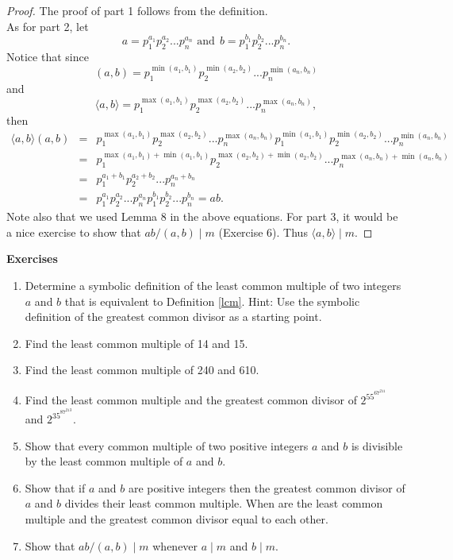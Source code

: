 \documentclass[12pt,letterpaper]{book}
\begin{document}
\begin{proof}
The proof of part 1 follows from the definition.  \\
As for part 2, let
\begin{equation*}
a=p_1^{a_1}p_2^{a_2}...p_n^{a_n} \mbox{ and} \ \
b=p_1^{b_1}p_2^{b_2}...p_n^{b_n}.
\end{equation*}
Notice that since
\begin{equation*}
(a,b)=p_1^{\min(a_1,b_1)}p_2^{\min(a_2,b_2)}...p_n^{\min(a_n,b_n)}
\end{equation*}
and
\begin{equation*}
\langle
a,b\rangle=p_1^{\max(a_1,b_1)}p_2^{\max(a_2,b_2)}...p_n^{\max(a_n,b_n)},
\end{equation*}
then
\begin{eqnarray*}
\langle a,b
\rangle(a,b)&=&p_1^{\max(a_1,b_1)}p_2^{\max(a_2,b_2)}...p_n^{\max(a_n,b_n)}
p_1^{\min(a_1,b_1)}p_2^{\min(a_2,b_2)}...p_n^{\min(a_n,b_n)}\\ &=&
p_1^{\max(a_1,b_1)+\min(a_1,b_1)}p_2^{\max(a_2,b_2)+\min(a_2,b_2)}...p_n^{\max(a_n,b_n)+\min(a_n,b_n)}\\&=&
p_1^{a_1+b_1}p_2^{a_2+b_2}...p_n^{a_n+b_n}\\&=&p_1^{a_1}p_2^{a_2}...p_n^{a_n}p_1^{b_1}p_2^{b_2}...p_n^{b_n}=ab.
\end{eqnarray*}
Note also that we used Lemma 8 in the above equations.  For part
3, it would be a nice exercise to show that $ab/(a,b) \mid m$
(Exercise 6). Thus $\langle a,b \rangle \mid m$.
\end{proof}

\textbf{Exercises}
\begin{enumerate}
\item{Determine a symbolic definition of the least common multiple of two integers $a$ and $b$ that is equivalent to Definition \ref{lcm}.  Hint: Use the symbolic definition of the greatest common divisor as a starting point.} \item{Find the least common multiple of 14 and 15.}\item{Find the
least common multiple of 240 and 610.}\item{Find the least common
multiple and the greatest common divisor of $2^55^67^211$ and
$2^35^87^213$.}\item{Show that every common multiple of two positive
integers $a$ and $b$ is divisible by the least common multiple of
$a$ and $b$.}\item{Show that if $a$ and $b$ are positive integers
then the greatest common divisor of $a$ and $b$ divides their least
common multiple.  When are the least common multiple and the
greatest common divisor equal to each other.}
\item{Show that $ab/(a,b) \mid m$ whenever $a\mid m$ and $b\mid m$.}
\end{enumerate}
\end{document}
